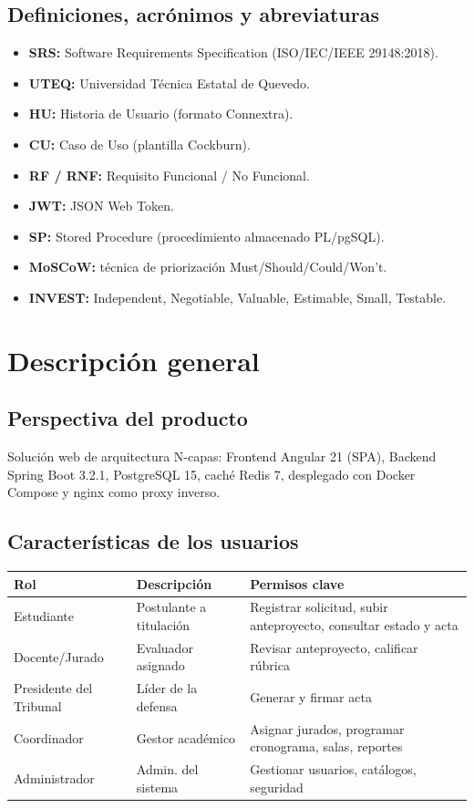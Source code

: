 \documentclass[11pt,a4paper]{article}
\begin{document}
\subsection{Definiciones, acrónimos y abreviaturas}
\begin{itemize}[nosep]
    \item \textbf{SRS:} Software Requirements Specification (ISO/IEC/IEEE 29148:2018).
    \item \textbf{UTEQ:} Universidad Técnica Estatal de Quevedo.
    \item \textbf{HU:} Historia de Usuario (formato Connextra).
    \item \textbf{CU:} Caso de Uso (plantilla Cockburn).
    \item \textbf{RF / RNF:} Requisito Funcional / No Funcional.
    \item \textbf{JWT:} JSON Web Token.
    \item \textbf{SP:} Stored Procedure (procedimiento almacenado PL/pgSQL).
    \item \textbf{MoSCoW:} técnica de priorización Must/Should/Could/Won't.
    \item \textbf{INVEST:} Independent, Negotiable, Valuable, Estimable, Small, Testable.
\end{itemize}

\section{Descripción general}

\subsection{Perspectiva del producto}
Solución web de arquitectura N-capas: Frontend Angular 21 (SPA), Backend Spring Boot 3.2.1, PostgreSQL
15, caché Redis 7, desplegado con Docker Compose y nginx como proxy inverso.

\subsection{Características de los usuarios}
\begin{table}[H]
\centering
\begin{tabular}{ll p{7cm}}
\toprule
\textbf{Rol} & \textbf{Descripción} & \textbf{Permisos clave} \\
\midrule
Estudiante & Postulante a titulación & Registrar solicitud, subir anteproyecto, consultar estado y acta \\
Docente/Jurado & Evaluador asignado & Revisar anteproyecto, calificar rúbrica \\
Presidente del Tribunal & Líder de la defensa & Generar y firmar acta \\
Coordinador & Gestor académico & Asignar jurados, programar cronograma, salas, reportes \\
Administrador & Admin. del sistema & Gestionar usuarios, catálogos, seguridad \\
\bottomrule
\end{tabular}
\end{table}
\end{document}
